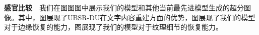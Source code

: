 \noindent\textbf{感官比较}\ \ 我们在图图图中展示我们的模型和其他当前最先进模型生成的超分图像。其中，图展现了UBSR-DU在文字内容重建方面的优势，图展现了我们的模型对于边缘恢复的能力，图展现了我们的模型对于纹理细节的恢复能力。




    
    

